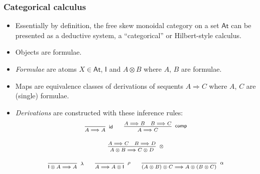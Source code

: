 \documentclass[10pt,t]{beamer}
\newcommand{\I}{\mathsf{I}}
\newcommand{\ot}{\otimes}
\newcommand{\C}{\mathbb{C}}
\newcommand{\al}{\alpha}
\newcommand{\lam}{\lambda}
\newcommand{\Var}{\mathsf{At}}
\newcommand{\tto}{\Longrightarrow}
\newcommand{\id}{\mathsf{id}}
\newcommand{\comp}{\circ}
\newcommand{\dcomp}{\mathsf{comp}}
\newcommand{\e}{\mathsf{e}}
\newcommand{\m}{\mathsf{m}}
\begin{document}

 





\begin{frame}

  \frametitle{Categorical calculus}

\begin{itemize}

\item Essentially by definition, the free skew monoidal category on a
  set $\Var$ can be presented as a deductive system, a ``categorical''
  or Hilbert-style calculus.

\medskip

\item Objects are formulae. 

\item \emph{Formulae} are atoms $X \in \Var$, $\I$ and $A \ot B$ where
  $A$, $B$ are formulae.

\medskip

\item Maps are equivalence classes of derivations of sequents
  $A \tto C$ where $A$, $C$ are (single) formulae.

\item \emph{Derivations} are constructed with these inference rules:
\[
\scriptsize
\begin{array}{c}
\infer[\id]{A \tto A}{}
\qquad
\infer[\dcomp]{A \tto C}{A \tto B & B \tto C}
\\[12pt]
\infer[\ot]{A \ot B \tto C \ot D}{A \tto C & B \tto D}
\\[12pt]
\infer[\lam]{\I \ot A \tto A}{}
\qquad
\infer[\rho]{A \tto A \ot \I}{}
\qquad
\infer[\al]{(A \ot B) \ot C \tto A \ot (B \ot C)}{}
\end{array}
\]

\end{itemize}


\end{frame}
\end{document}
